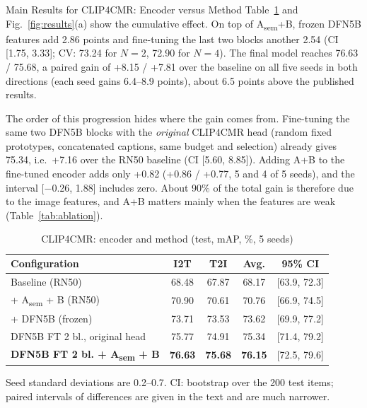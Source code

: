 \documentclass[conference]{IEEEtran}
\makeatletter
\newcommand{\Asem}{A\textsubscript{sem}}
\def\subsection{\@startsection{subsection}{2}{\z@}{1.6ex plus .8ex minus .4ex}{.7ex plus .2ex}%
  {\normalfont\fontsize{11}{13}\selectfont\bfseries\itshape\raggedright}}
\makeatother
\begin{document}
\subsection{Main Results for CLIP4CMR: Encoder versus Method}
Table~\ref{tab:clip4cmr} and Fig.~\ref{fig:results}(a) show the cumulative effect. On top of \Asem+B, frozen DFN5B features add 2.86 points and fine-tuning the last two blocks another 2.54 (CI [1.75, 3.33]; CV: 73.24 for $N = 2$, 72.90 for $N = 4$). The final model reaches 76.63 / 75.68, a paired gain of +8.15 / +7.81 over the baseline on all five seeds in both directions (each seed gains 6.4--8.9 points), about 6.5 points above the published results.

The order of this progression hides where the gain comes from. Fine-tuning the same two DFN5B blocks with the \emph{original} CLIP4CMR head (random fixed prototypes, concatenated captions, same budget and selection) already gives 75.34, i.e.\ +7.16 over the RN50 baseline (CI [5.60, 8.85]). Adding A+B to the fine-tuned encoder adds only +0.82 (+0.86 / +0.77, 5 and 4 of 5 seeds), and the interval [$-$0.26, 1.88] includes zero. About 90\% of the total gain is therefore due to the image features, and A+B matters mainly when the features are weak (Table~\ref{tab:ablation}).

\begin{table}[t]
\centering
\caption{CLIP4CMR: encoder and method (test, mAP, \%, 5 seeds)}
\label{tab:clip4cmr}
\small
\setlength{\tabcolsep}{3pt}
\begin{tabular*}{\columnwidth}{@{\extracolsep{\fill}}lcccc@{}}
\toprule
Configuration & I2T & T2I & Avg. & 95\% CI \\
\midrule
Baseline (RN50) & 68.48 & 67.87 & 68.17 & [63.9, 72.3] \\
+ \Asem{} + B (RN50) & 70.90 & 70.61 & 70.76 & [66.9, 74.5] \\
+ DFN5B (frozen) & 73.71 & 73.53 & 73.62 & [69.9, 77.2] \\
DFN5B FT 2 bl., original head & 75.77 & 74.91 & 75.34 & [71.4, 79.2] \\
\textbf{DFN5B FT 2 bl. + \Asem{} + B} & \textbf{76.63} & \textbf{75.68} & \textbf{76.15} & [72.5, 79.6] \\
\bottomrule
\end{tabular*}

\vspace{2pt}
\parbox{\columnwidth}{\footnotesize Seed standard deviations are 0.2--0.7. CI: bootstrap over the 200 test items; paired intervals of differences are given in the text and are much narrower.}
\end{table}
\end{document}
